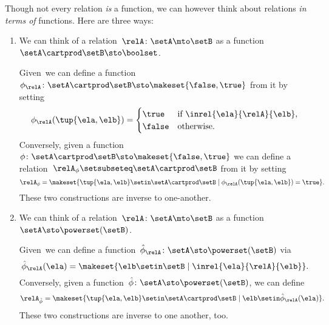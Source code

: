 \label{rem:rel-three-fun-descriptions}
Though not every relation \emph{is} a function, we can however think about relations \emph{in terms of} functions.
Here are three ways:
\begin{enumerate}
    \item We can think of a relation~$\relA \colon \setA \mto\setB$ as a function~$\setA \cartprod \setB \sto \boolset$.

          Given~\relA we can define a function~$\phi_{\relA} \colon \setA \cartprod \setB \sto \makeset{ \false, \true }$ from it by setting
          \begin{equation}
              \phi_{\relA}(\tup{\ela, \elb}) =
              \begin{cases}
                  \true  & \text{if } \inrel{\ela}{\relA}{\elb}, \\
                  \false & \text{otherwise}.
              \end{cases}
          \end{equation}
          Conversely, given a function~$\phi\colon \setA \cartprod \setB \sto \makeset{ \false, \true }$ we can define a relation~$\relA_{\phi} \setsubseteq \setA \cartprod \setB$ from it by setting
          \begin{equation}
              \relA_{\phi} = \makeset{ \tup{\ela, \elb} \setin \setA \cartprod \setB \mid \phi_{\relA}(\tup{\ela, \elb}) = \true }.
          \end{equation}
          These two constructions are inverse to one-another.

    \item We can think of a relation~$\relA \colon \setA \mto \setB$ as a function~$\setA  \sto \powerset (\setB)$.

          Given~\relA we can define a function~$\hat \phi_{\relA} \colon \setA \sto \powerset (\setB)$ via
          \begin{equation}
              \hat \phi_{\relA} (\ela) = \makeset{ \elb \setin \setB \mid \inrel{\ela}{\relA}{\elb}}.
          \end{equation}
          Conversely, given a function~$\hat \phi \colon \setA \sto \powerset (\setB)$, we can define
          \begin{equation}
              \relA_{\hat \phi} = \makeset{ \tup{\ela, \elb} \setin \setA \cartprod \setB \mid \elb \setin \hat \phi_{\relA}(\ela)   }.
          \end{equation}
          These two constructions are inverse to one another, too.


\end{enumerate}
